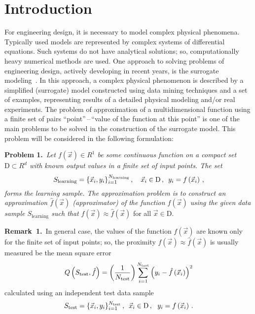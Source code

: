       \thispagestyle{headings}

      \begin{multicols}{2}

            \label{st\stat}

\section{Introduction}

\noindent For engineering design, it is necessary to model complex physical 
phenomena. Typically used models are represented by complex systems of 
differential equations. Such systems do not have analytical solutions; so, 
computationally heavy numerical methods are used. One approach to solving 
problems of engineering design,
   actively developing in recent years, is the surrogate modeling~\cite{surrogateModeling, kuleshov2}.
In this approach, a complex physical phenomenon is described by a simplified 
(surrogate) model constructed using data mining techniques and a set of 
examples,
   representing results of a detailed physical modeling and/or real experiments.
The problem of approximation of a multidimensional function using a finite set 
of pairs ``point''\,--\,``value of the function at this point'' is one of the 
main problems to be solved in the construction of the surrogate model.  
This problem  will be considered in the following formulation:

\medskip

\noindent \textbf{Problem 1.}\ \textit{Let $f\left( {\vec x} \right) \in R^1$ 
be some continuous function on a compact set 
$
\mathrm{D} \subset R^d$ with known 
output values in a finite set of input points. The set 
 \begin{equation*}
 S_{\mathrm{learning}} = \{ {\vec x}_i, y_i \}_{i=1}^{N_{\mathrm{learning}}}\,,\ \ \ 
{\vec x}_i \in \mathrm{D}\,,\enskip 
y_i = f\left( {\vec x}_i\right)\,,
\end{equation*} 
forms the learning sample.
The approximation problem is to construct an approximation      
$\hat f\left( {\vec x} \right)$ (approximator) of the function $f\left( {\vec x} \right)$
    using the given data sample $S_{\mathrm{learning}}$ such that}
    $f\left( {\vec x} \right) \approx \hat f\left( {\vec x} \right)$
for all $\vec x\in\mathrm{D}$.


\medskip

\noindent \textbf{Remark~1.}\ In general case, the values of the function $f\left( 
{\vec x} \right)$ are known only for the finite set of input points; so, the 
proximity $f\left( {\vec x} \right) \approx \hat f\left( {\vec x} \right)$ is 
usually measured be the mean square error
$$
Q\left( S_{\mathrm{test}}, \hat f \right) = \left(\displaystyle\frac{\displaystyle 1\mathstrut}{\displaystyle N_{\mathrm{test}}\mathstrut}\right) 
    \sum\limits_{i=1}^{N_{\mathrm{test}}} \left( y_i - \hat f \left( 
    \vec x_i\right) \right)^2
    $$ 
    calculated using an independent test data sample
      $$
      S_{\mathrm{test}} = \{ {\vec x}_i, y_i \}_{i=1}^{N_{\mathrm{test}}}\,,\enskip  
{\vec x}_i \in \mathrm{D}\,,\ 
\ y_i = f\left( {\vec x}_i\right)\,.
$$ 


\end{multicols}
